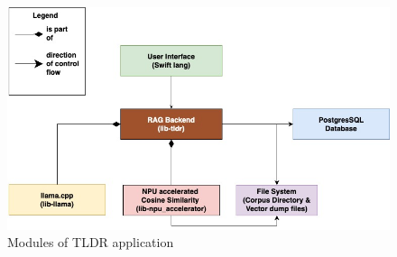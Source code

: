 \begin{figure}[H]
    \centering
    \includegraphics[width=1.0\linewidth]{images/tldr-app-modules.jpg}
    \caption{Modules of TLDR application}
    \label{fig:tldr_modules}
\end{figure}

